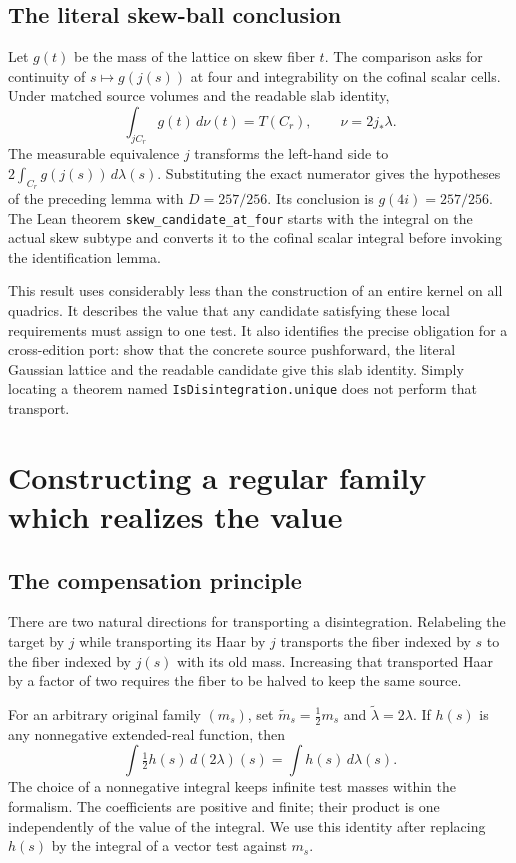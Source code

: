 \documentclass[12pt,letterpaper]{article}
\newcommand{\id}[1]{{\small\nolinkurl{#1}}}
\begin{document}
\subsection{The literal skew-ball conclusion}
Let $g(t)$ be the mass of the lattice on skew fiber $t$. The comparison asks for continuity of $s\mapsto g(j(s))$ at four and integrability on the cofinal scalar cells. Under matched source volumes and the readable slab identity,
\[
 \int_{jC_r}g(t)\,d\nu(t)=T(C_r),\qquad \nu=2j_*\lambda.
\]
The measurable equivalence $j$ transforms the left-hand side to $2\int_{C_r} g(j(s))\,d\lambda(s)$. Substituting the exact numerator gives the hypotheses of the preceding lemma with $D=257/256$. Its conclusion is $g(4i)=257/256$. The Lean theorem \id{skew_candidate_at_four} starts with the integral on the actual skew subtype and converts it to the cofinal scalar integral before invoking the identification lemma.

This result uses considerably less than the construction of an entire kernel on all quadrics. It describes the value that any candidate satisfying these local requirements must assign to one test. It also identifies the precise obligation for a cross-edition port: show that the concrete source pushforward, the literal Gaussian lattice and the readable candidate give this slab identity. Simply locating a theorem named \id{IsDisintegration.unique} does not perform that transport.



\section{Constructing a regular family which realizes the value}
\subsection{The compensation principle}
There are two natural directions for transporting a disintegration. Relabeling the target by $j$ while transporting its Haar by $j$ transports the fiber indexed by $s$ to the fiber indexed by $j(s)$ with its old mass. Increasing that transported Haar by a factor of two requires the fiber to be halved to keep the same source.

For an arbitrary original family $(m_s)$, set $\widetilde m_s=\tfrac12 m_s$ and $\widetilde\lambda=2\lambda$. If $h(s)$ is any nonnegative extended-real function, then
\[
    \int \tfrac12 h(s)\,d(2\lambda)(s)=\int h(s)\,d\lambda(s).
\]
The choice of a nonnegative integral keeps infinite test masses within the formalism. The coefficients are positive and finite; their product is one independently of the value of the integral. We use this identity after replacing $h(s)$ by the integral of a vector test against $m_s$.
\end{document}
